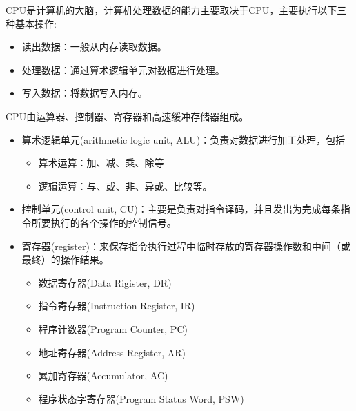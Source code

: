 \begin{frame}
CPU是计算机的大脑，计算机处理数据的能力主要取决于CPU，主要执行以下三种基本操作: 

\begin{itemize}
\item 读出数据：一般从内存读取数据。 \\[0.1in]
\item 处理数据：通过算术逻辑单元对数据进行处理。 \\[0.1in]
\item 写入数据：将数据写入内存。
\end{itemize}

\end{frame}

\begin{frame}
 
CPU由运算器、控制器、寄存器和高速缓冲存储器组成。

\end{frame}

\begin{frame}
\begin{itemize}
\item  算术逻辑单元(arithmetic logic unit, ALU)：负责对数据进行加工处理，包括
\begin{itemize}
\item 算术运算：加、减、乘、除等
\item 逻辑运算：与、或、非、异或、比较等。
\end{itemize} \vspace{.2in}
\item  控制单元(control unit, CU)：主要是负责对指令译码，并且发出为完成每条指令所要执行的各个操作的控制信号。\\[0.2in]
\item  \href{https://blog.csdn.net/kwame211/article/details/77773621}{寄存器(register)}：来保存指令执行过程中临时存放的寄存器操作数和中间（或最终）的操作结果。
  \begin{itemize}
  \item 数据寄存器(Data Rigister, DR)
  \item 指令寄存器(Instruction Register, IR)
  \item 程序计数器(Program Counter, PC)
  \item 地址寄存器(Address Register, AR)
  \item 累加寄存器(Accumulator, AC)
  \item 程序状态字寄存器(Program Status Word, PSW)
  \end{itemize}\vspace{0.2in}

\end{itemize}
\end{frame}
 
